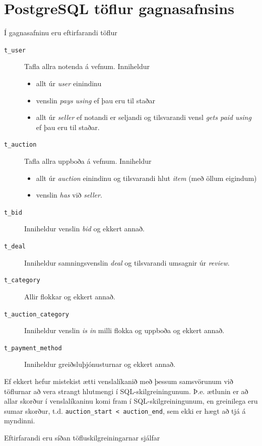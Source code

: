 \documentclass[a4paper,icelandic]{article}
\theoremstyle{definition} \newtheorem{skilgr}{Skilgreining}
\theoremstyle{plain}      \newtheorem{setn}{Setning}
\theoremstyle{remark}     \newtheorem*{lausn}{Lausn}
\begin{document}
\section{PostgreSQL töflur gagnasafnsins}

Í gagnasafninu eru eftirfarandi töflur

\begin{description}
    \item[\texttt{t\_user}] Tafla allra notenda á vefnum. Inniheldur 
        \begin{itemize}
            \item allt úr \emph{user} einindinu
            \item venslin \emph{pays using} ef þau eru til staðar
            \item allt úr \emph{seller} ef notandi er seljandi og tilsvarandi
                vensl \emph{gets paid using} ef þau eru til staðar.
        \end{itemize}
    \item[\texttt{t\_auction}] Tafla allra uppboða á vefnum. Inniheldur
        \begin{itemize}
            \item allt úr \emph{auction} einindinu og tilsvarandi hlut
                \emph{item} (með öllum eigindum)
            \item venslin \emph{has} við \emph{seller}.
        \end{itemize}
    \item[\texttt{t\_bid}] Inniheldur venslin \emph{bid} og ekkert annað.
    \item[\texttt{t\_deal}] Inniheldur samningsvenslin \emph{deal} og
        tilsvarandi umsagnir úr \emph{review}.
    \item[\texttt{t\_category}] Allir flokkar og ekkert annað.
    \item[\texttt{t\_auction\_category}] Inniheldur venslin \emph{is in} milli
        flokka og uppboða og ekkert annað.
    \item[\texttt{t\_payment\_method}] Inniheldur greiðsluþjónusturnar og ekkert
        annað.
\end{description}
Ef ekkert hefur mistekist ætti venslalíkanið með þessum samsvörunum við
töflurnar að vera strangt hlutmengi í SQL-skilgreiningunum. Þ.e. ætlunin er að
allar skorður í venslalíkaninu komi fram í SQL-skilgreiningunum, en greinilega
eru sumar skorður, t.d. \verb|auction_start < auction_end|, sem ekki er hægt að
tjá á myndinni.

Eftirfarandi eru síðan töfluskilgreiningarnar sjálfar

\end{document}
